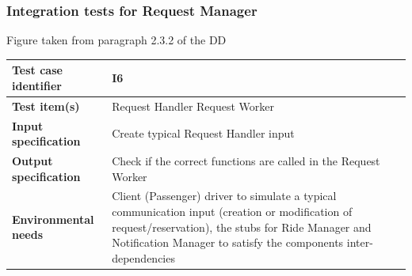 \documentclass[a4paper,11pt]{report} %
\begin{document}
		\subsubsection{Integration tests for Request Manager} \label{sec:3.1.4}
			\begin{minipage}{\linewidth}
			\end{minipage}
			\begin{center}
				Figure taken from paragraph 2.3.2 of the DD
			\end{center} 
			\begin{center}
				\renewcommand{\arraystretch}{1.2}
				\setlength{\tabcolsep}{24pt}
				\begin{tabular}{ l  p{9cm}}\hline
					\textbf{Test case identifier} & I6\\\hline
					\textbf{Test item(s)} & Request Handler \textrightarrow Request Worker\\\hline
					\textbf{Input specification} & Create typical Request Handler input \\\hline
					\textbf{Output specification} & Check if the correct functions are called in the Request Worker\\\hline
					\textbf{Environmental needs} & Client (Passenger) driver to simulate a typical communication input (creation or modification of request/reservation), the stubs for Ride Manager and Notification Manager to satisfy the components inter-dependencies\\\hline
				\end{tabular}
			\end{center}	
			\bigskip	
\end{document}
